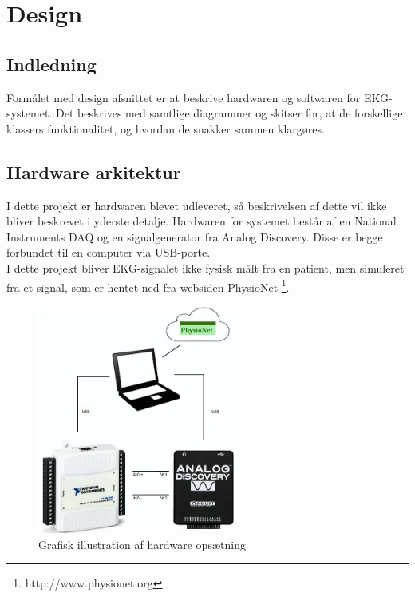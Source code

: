 \chapter{Design}

\section{Indledning}
Formålet med design afsnittet er at beskrive hardwaren og softwaren for EKG-systemet. Det beskrives med samtlige diagrammer og skitser for, at de forskellige klassers funktionalitet, og hvordan de snakker sammen klargøres.
  
\section{Hardware arkitektur}
I dette projekt er hardwaren blevet udleveret, så beskrivelsen af dette vil ikke  bliver beskrevet i yderste detalje. Hardwaren for systemet består af en National Instruments DAQ og en signalgenerator fra Analog Discovery. Disse er begge forbundet til en computer via USB-porte.
\\ 
I dette projekt bliver EKG-signalet ikke fysisk målt fra en patient, men simuleret fra et signal, som er hentet ned fra websiden PhysioNet \footnote{http://www.physionet.org}. 

\begin{figure}[H]
	\centering
	\includegraphics[width=0.6\textwidth]{Figurer/Snip20150427_1}
	\caption{Grafisk illustration af hardware opsætning}
\end{figure}

